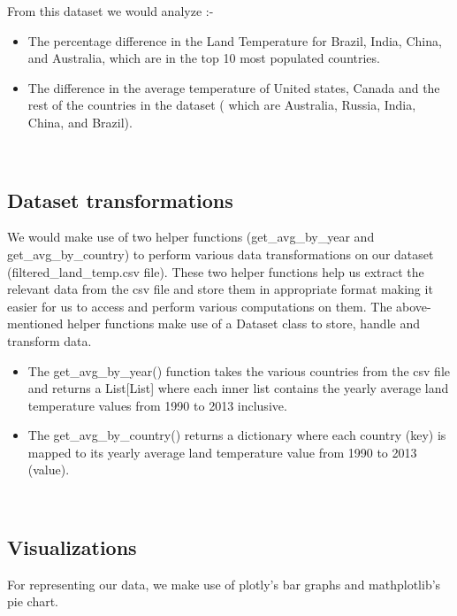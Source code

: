 \documentclass[a4paper, 11pt]{report}
\begin{document}
From this dataset we would analyze :-

\begin{itemize}
    \item The percentage difference in the Land Temperature for Brazil, India,  China, and Australia, which are in the top 10 most populated countries.

    \item The difference in the average temperature of United states, Canada and the rest of the countries in the dataset ( which are Australia, Russia, India, China, and Brazil).
\end{itemize}
~\\
\subsection{Dataset transformations}

We would make use of two helper functions (get\_avg\_by\_year and get\_avg\_by\_country) to perform various data transformations on our dataset (filtered\_land\_temp.csv file). These two helper functions help us extract the relevant data from the csv file and store them in appropriate format making it easier for us to access and perform various computations on them. The above-mentioned helper functions make use of a Dataset class to store, handle and transform data.

\begin{itemize}
    \item The get\_avg\_by\_year() function takes the various countries from the csv file and returns a List[List] where each inner list contains the yearly average land temperature values from 1990 to 2013 inclusive.

    \item The get\_avg\_by\_country() returns a dictionary where each country (key) is mapped to its yearly average land temperature value from 1990 to 2013 (value).
\end{itemize}
~\\

\subsection{Visualizations}

For representing our data, we make use of plotly’s bar graphs and mathplotlib’s pie chart.
\end{document}
